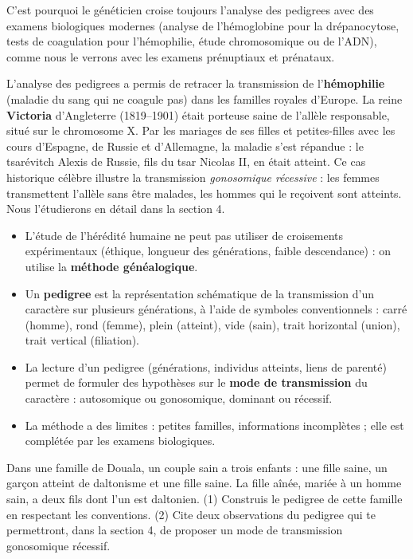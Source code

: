 \documentclass[11pt]{article}
\begin{document}
C'est pourquoi le généticien croise toujours l'analyse des pedigrees avec des examens biologiques modernes (analyse de l'hémoglobine pour la drépanocytose, tests de coagulation pour l'hémophilie, étude chromosomique ou de l'ADN), comme nous le verrons avec les examens prénuptiaux et prénataux.

\begin{savaistu}
L'analyse des pedigrees a permis de retracer la transmission de l'\textbf{hémophilie} (maladie du sang qui ne coagule pas) dans les familles royales d'Europe. La reine \textbf{Victoria} d'Angleterre (1819--1901) était porteuse saine de l'allèle responsable, situé sur le chromosome X. Par les mariages de ses filles et petites-filles avec les cours d'Espagne, de Russie et d'Allemagne, la maladie s'est répandue : le tsarévitch Alexis de Russie, fils du tsar Nicolas II, en était atteint. Ce cas historique célèbre illustre la transmission \emph{gonosomique récessive} : les femmes transmettent l'allèle sans être malades, les hommes qui le reçoivent sont atteints. Nous l'étudierons en détail dans la section 4.
\end{savaistu}

\begin{aretenir}
\begin{itemize}
\item L'étude de l'hérédité humaine ne peut pas utiliser de croisements expérimentaux (éthique, longueur des générations, faible descendance) : on utilise la \textbf{méthode généalogique}.
\item Un \textbf{pedigree} est la représentation schématique de la transmission d'un caractère sur plusieurs générations, à l'aide de symboles conventionnels : carré (homme), rond (femme), plein (atteint), vide (sain), trait horizontal (union), trait vertical (filiation).
\item La lecture d'un pedigree (générations, individus atteints, liens de parenté) permet de formuler des hypothèses sur le \textbf{mode de transmission} du caractère : autosomique ou gonosomique, dominant ou récessif.
\item La méthode a des limites : petites familles, informations incomplètes ; elle est complétée par les examens biologiques.
\end{itemize}
\end{aretenir}

\begin{exercice}
Dans une famille de Douala, un couple sain a trois enfants : une fille saine, un garçon atteint de daltonisme et une fille saine. La fille aînée, mariée à un homme sain, a deux fils dont l'un est daltonien. (1) Construis le pedigree de cette famille en respectant les conventions. (2) Cite deux observations du pedigree qui te permettront, dans la section 4, de proposer un mode de transmission gonosomique récessif.
\end{exercice}
\end{document}
